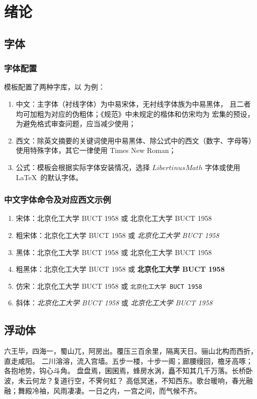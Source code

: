 \chapter{绪论}
\section{字体}
\subsection{字体配置}
模板配置了两种字库，以  为例：
\begin{enumerate}
	\item 中文：主字体（衬线字体）为中易宋体，无衬线字体族为中易黑体，%
	且二者均可加粗为对应的伪粗体；《规范》中未规定的楷体和仿宋均为  宏集的预设，为避免格式审查问题，应当减少使用；
	\item 西文：除英文摘要的关键词使用中易黑体、除公式中的西文（数字、字母等）使用特殊字体，其它一律使用 Times New Roman；
	\item 公式：模板会根据实际字体安装情况，选择 $LibertinusMath$ 字体或使用 \LaTeX\ 的默认字体。
\end{enumerate}

\subsection{中文字体命令及对应西文示例}
\begin{enumerate}
	\item 宋体：北京化工大学 BUCT 1958 或 \textrm{北京化工大学 BUCT 1958}
	\item 粗宋体：{\bfsong 北京化工大学 BUCT 1958} 或 \emph{北京化工大学 BUCT 1958}
	\item 黑体：{\heiti 北京化工大学 BUCT 1958} 或 \textsf{北京化工大学 BUCT 1958}
	\item 粗黑体：{\bfhei 北京化工大学 BUCT 1958} 或 \textsf{\bfseries 北京化工大学 BUCT 1958}
	\item 仿宋：{\ttfamily 北京化工大学 BUCT 1958} 或 \texttt{北京化工大学 BUCT 1958}
	\item 斜体：{\itshape 北京化工大学 BUCT 1958} 或 \textit{北京化工大学 BUCT 1958}
\end{enumerate}

\section{浮动体}
六王毕，四海一，蜀山兀，阿房出。覆压三百余里，隔离天日。骊山北构而西折，直走咸阳。
二川溶溶，流入宫墙。五步一楼，十步一阁；廊腰缦回，檐牙高啄；各抱地势，钩心斗角。
盘盘焉，囷囷焉，蜂房水涡，矗不知其几千万落。长桥卧波，未云何龙？复道行空，不霁何虹？
高低冥迷，不知西东。歌台暖响，春光融融；舞殿冷袖，风雨凄凄。一日之内，一宫之间，而气候不齐。

